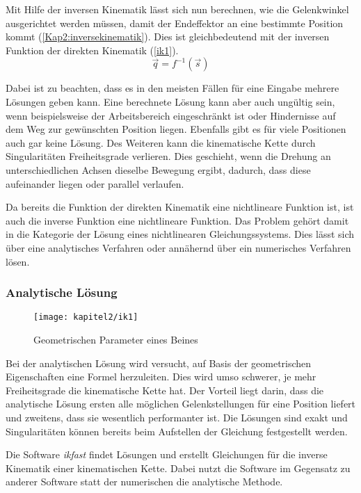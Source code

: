 Mit Hilfe der inversen Kinematik lässt sich nun berechnen, wie die Gelenkwinkel ausgerichtet werden müssen, damit der Endeffektor an eine bestimmte Position kommt (\autoref{Kap2:inversekinematik}). Dies ist gleichbedeutend mit der inversen Funktion der direkten Kinematik (\autoref{ik1}).
\begin{equation}
  \vec{q} = f^{-1}(\vec{s})
\label{ik1}
\end{equation}

Dabei ist zu beachten, dass es in den meisten Fällen für eine Eingabe mehrere Lösungen geben kann. Eine berechnete Lösung kann aber auch ungültig sein, wenn beispielsweise der Arbeitsbereich eingeschränkt ist oder Hindernisse auf dem Weg zur gewünschten Position liegen. Ebenfalls gibt es für viele Positionen auch gar keine Lösung. Des Weiteren kann die kinematische Kette durch Singularitäten Freiheitsgrade verlieren. Dies geschieht, wenn die Drehung an unterschiedlichen Achsen dieselbe Bewegung ergibt, dadurch, dass diese aufeinander liegen oder parallel verlaufen.

Da bereits die Funktion der direkten Kinematik eine nichtlineare Funktion ist, ist auch die inverse Funktion eine nichtlineare Funktion. Das Problem gehört damit in die Kategorie der Lösung eines nichtlinearen Gleichungssystems. Dies lässt sich über eine analytisches Verfahren oder annähernd über ein numerisches Verfahren lösen.

\subsubsection{Analytische Lösung}

\begin{figure}[b!]
  \centering
  \texttt{[image: kapitel2/ik1]}
  \caption{Geometrischen Parameter eines Beines}
  \label{kap2:inversekinematik1}
\end{figure}

Bei der analytischen Lösung wird versucht, auf Basis der geometrischen Eigenschaften eine Formel herzuleiten. Dies wird umso schwerer, je mehr Freiheitsgrade die kinematische Kette hat. Der Vorteil liegt darin, dass die analytische Lösung ersten alle möglichen Gelenkstellungen für eine Position liefert und zweitens, dass sie wesentlich performanter ist. Die Lösungen sind exakt und Singularitäten können bereits beim Aufstellen der Gleichung festgestellt werden.

Die Software \emph{ikfast} \autocite{diankov2010ikfast} findet Lösungen und erstellt Gleichungen für die inverse Kinematik einer kinematischen Kette. Dabei nutzt die Software im Gegensatz zu anderer Software statt der numerischen die analytische Methode.

